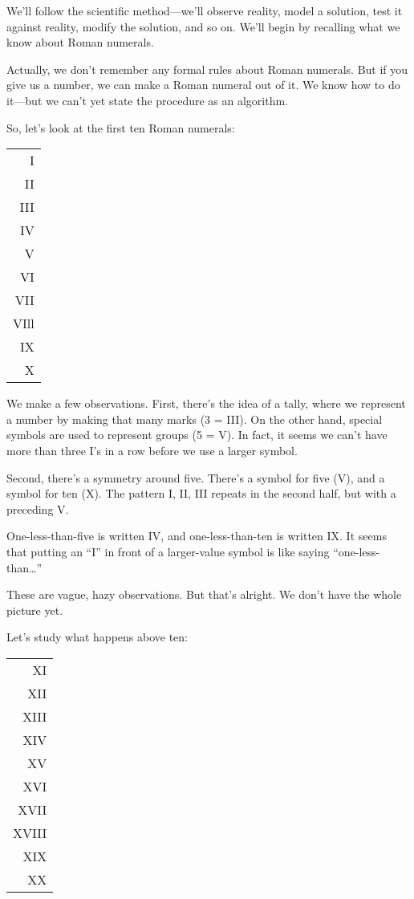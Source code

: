 We'll follow the scientific method---we'll observe reality, model a
solution, test it against reality, modify the solution, and so on. We'll
begin by recalling what we know about Roman numerals.

Actually, we don't remember any formal rules about Roman
numerals. But if you give us a number, we can make a Roman numeral
out of it. We know how to do it---but we can't yet state the procedure as
an algorithm.

So, let's look at the first ten Roman numerals:

\bigskip
{\sf\begin{tabular}{r}
I \\
II \\
III \\
IV \\
V \\
VI \\
VII \\
VIll \\
IX \\
X \\
\end{tabular}}
\bigskip

\noindent We make a few observations. First, there's the idea of a
tally, where we represent a number by making that many marks (3 =
III). On the other hand, special symbols are used to represent groups
(5 = V). In fact, it seems we can't have more than three I's in a row
before we use a larger symbol.

Second, there's a symmetry around five. There's a symbol for five
(V), and a symbol for ten (X). The pattern I, II, III repeats in the second
half, but with a preceding V.

One-less-than-five is written IV, and one-less-than-ten is written IX.
It seems that putting an ``I'' in front of a larger-value symbol is like
saying ``one-less-than\dots{}''

These are vague, hazy observations. But that's alright. We don't
have the whole picture yet.

Let's study what happens above ten:

\bigskip
{\sf\begin{tabular}{r}
XI \\
XII \\
XIII \\
XIV \\
XV \\
XVI \\
XVII \\
XVIII \\
XIX \\
XX \\
\end{tabular}}

